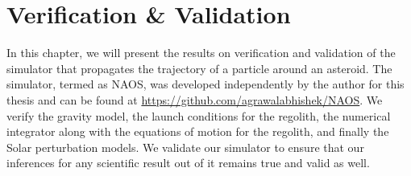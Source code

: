 \chapter{Verification \& Validation}
\label{chap:v_and_v}
\graphicspath{{V&V/}}

In this chapter, we will present the results on verification and validation of the simulator that propagates the trajectory of a particle around an asteroid. The simulator, termed as \gls{NAOS}, was developed independently by the author for this thesis and can be found at \url{https://github.com/agrawalabhishek/NAOS}. We verify the gravity model, the launch conditions for the regolith, the numerical integrator along with the equations of motion for the regolith, and finally the Solar perturbation models. We validate our simulator to ensure that our inferences for any scientific result out of it remains true and valid as well.

